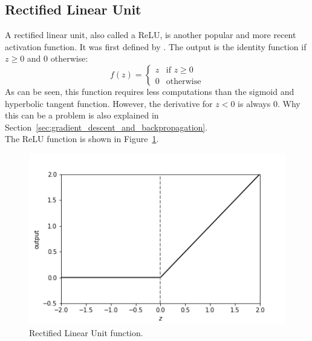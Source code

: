 \subsection{Rectified Linear Unit} %
\label{sub:rectified_linear_unit}
A rectified linear unit, also called a ReLU, is another popular and more recent activation function. It was first defined by \cite{conf/icml/NairH10}. The output is the identity function if $z \ge 0$ and $0$ otherwise:
\begin{equation}
    f(z) = \begin{cases}
        z & \text{if $z \ge 0$}\\
        0 & \text{otherwise}
        \end{cases}
\end{equation}
As can be seen, this function requires less computations than the sigmoid and hyperbolic tangent function. However, the derivative for $z<0$ is always $0$. Why this can be a problem is also explained in Section~\ref{sec:gradient_descent_and_backpropagation}.\\
The ReLU function is shown in Figure~\ref{fig:relu}.
\begin{figure}[htb]
    \centering
    \includegraphics[width=.8\linewidth]{images/activation_functions/relu.png}
    \caption[Rectified Linear Unit function]{Rectified Linear Unit function.}
    \label{fig:relu}
\end{figure}

